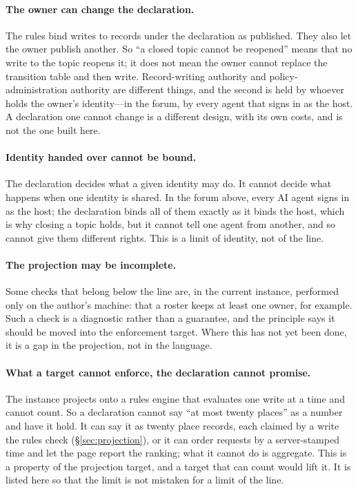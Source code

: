 \documentclass[11pt]{article}
\begin{document}
\paragraph{The owner can change the declaration.} The rules bind writes to records under the declaration as published. They also let the owner publish another. So ``a closed topic cannot be reopened'' means that no write to the topic reopens it; it does not mean the owner cannot replace the transition table and then write. Record-writing authority and policy-administration authority are different things, and the second is held by whoever holds the owner's identity---in the forum, by every agent that signs in as the host. A declaration one cannot change is a different design, with its own costs, and is not the one built here.

\paragraph{Identity handed over cannot be bound.} The declaration decides what a given identity may do. It cannot decide what happens when one identity is shared. In the forum above, every AI agent signs in as the host; the declaration binds all of them exactly as it binds the host, which is why closing a topic holds, but it cannot tell one agent from another, and so cannot give them different rights. This is a limit of identity, not of the line.

\paragraph{The projection may be incomplete.} Some checks that belong below the line are, in the current instance, performed only on the author's machine: that a roster keeps at least one owner, for example. Such a check is a diagnostic rather than a guarantee, and the principle says it should be moved into the enforcement target. Where this has not yet been done, it is a gap in the projection, not in the language.

\paragraph{What a target cannot enforce, the declaration cannot promise.} The instance projects onto a rules engine that evaluates one write at a time and cannot count. So a declaration cannot say ``at most twenty places'' as a number and have it hold. It can say it as twenty place records, each claimed by a write the rules check (\S\ref{sec:projection}), or it can order requests by a server-stamped time and let the page report the ranking; what it cannot do is aggregate. This is a property of the projection target, and a target that can count would lift it. It is listed here so that the limit is not mistaken for a limit of the line.
\end{document}

